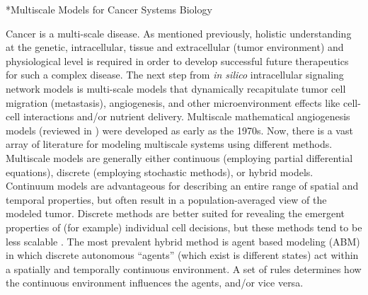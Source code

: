 \documentclass[12pt]{article}
\makeatletter
\renewcommand\subsection{\@startsection
	{subsection}{2}{0mm}
	{-0.05in}
	{-0.5\baselineskip}
	{\normalfont\normalsize\bfseries}}
\makeatother
\begin{document}
\subsection*{Multiscale Models for Cancer Systems Biology}

Cancer is a multi-scale disease. As mentioned previously, holistic understanding at the genetic, intracellular, tissue and extracellular (tumor environment) and physiological level is required in order to develop successful future therapeutics for such a complex disease. The next step from \textit{in silico} intracellular signaling network models is multi-scale models that dynamically recapitulate tumor cell migration (metastasis), angiogenesis, and other microenvironment effects like cell-cell interactions and/or nutrient delivery. Multiscale mathematical angiogenesis models (reviewed in \cite{Qutub2009}) were developed as early as the 1970s. Now, there is a vast array of literature for modeling multiscale systems using different methods. Multiscale models \cite{Deisboeck2011} are generally either continuous (employing partial differential equations), discrete (employing stochastic methods), or hybrid models. Continuum models \cite{Swanson2003,Massey2012} are advantageous for describing an entire range of spatial and temporal properties, but often result in a population-averaged view of the modeled tumor. Discrete methods \cite{Chavali2008,Hattne2005} are better suited for revealing the emergent properties of (for example) individual cell decisions, but these methods tend to be less scalable \cite{Chakrabarti2012}. The most prevalent hybrid method is agent based modeling (ABM) in which discrete autonomous \textquotedblleft agents\textquotedblright \: (which exist is different states) act within a spatially and temporally continuous environment. A set of rules determines how the continuous environment influences the agents, and/or vice versa.
	
\end{document}
